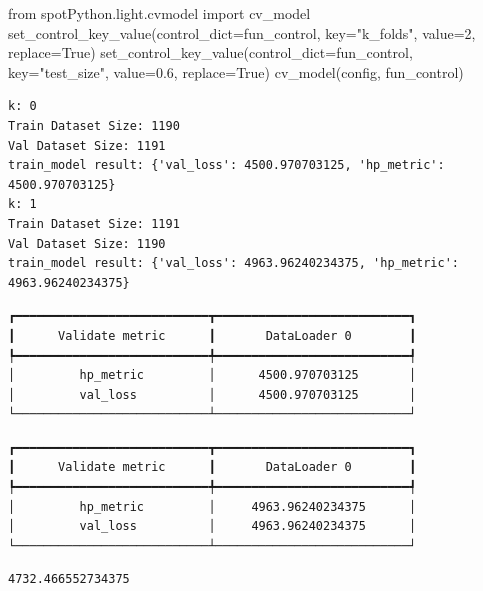 \documentclass[
  letterpaper,
  DIV=11,
  numbers=noendperiod]{scrreprt}
\newenvironment{Shaded}{\begin{snugshade}}{\end{snugshade}}
\newcommand{\DecValTok}[1]{\textcolor[rgb]{0.68,0.00,0.00}{#1}}
\newcommand{\FloatTok}[1]{\textcolor[rgb]{0.68,0.00,0.00}{#1}}
\newcommand{\ImportTok}[1]{\textcolor[rgb]{0.00,0.46,0.62}{#1}}
\newcommand{\NormalTok}[1]{\textcolor[rgb]{0.00,0.23,0.31}{#1}}
\newcommand{\OperatorTok}[1]{\textcolor[rgb]{0.37,0.37,0.37}{#1}}
\newcommand{\StringTok}[1]{\textcolor[rgb]{0.13,0.47,0.30}{#1}}
\newcommand{\VariableTok}[1]{\textcolor[rgb]{0.07,0.07,0.07}{#1}}
\begin{document}
\begin{Shaded}
\begin{Highlighting}[]
\ImportTok{from}\NormalTok{ spotPython.light.cvmodel }\ImportTok{import}\NormalTok{ cv\_model}
\NormalTok{set\_control\_key\_value(control\_dict}\OperatorTok{=}\NormalTok{fun\_control,}
\NormalTok{                        key}\OperatorTok{=}\StringTok{"k\_folds"}\NormalTok{,}
\NormalTok{                        value}\OperatorTok{=}\DecValTok{2}\NormalTok{,}
\NormalTok{                        replace}\OperatorTok{=}\VariableTok{True}\NormalTok{)}
\NormalTok{set\_control\_key\_value(control\_dict}\OperatorTok{=}\NormalTok{fun\_control,}
\NormalTok{                        key}\OperatorTok{=}\StringTok{"test\_size"}\NormalTok{,}
\NormalTok{                        value}\OperatorTok{=}\FloatTok{0.6}\NormalTok{,}
\NormalTok{                        replace}\OperatorTok{=}\VariableTok{True}\NormalTok{)}
\NormalTok{cv\_model(config, fun\_control)}
\end{Highlighting}
\end{Shaded}

\begin{verbatim}
k: 0
Train Dataset Size: 1190
Val Dataset Size: 1191
train_model result: {'val_loss': 4500.970703125, 'hp_metric': 4500.970703125}
k: 1
Train Dataset Size: 1191
Val Dataset Size: 1190
train_model result: {'val_loss': 4963.96240234375, 'hp_metric': 4963.96240234375}
\end{verbatim}

\begin{verbatim}
┏━━━━━━━━━━━━━━━━━━━━━━━━━━━┳━━━━━━━━━━━━━━━━━━━━━━━━━━━┓
┃      Validate metric      ┃       DataLoader 0        ┃
┡━━━━━━━━━━━━━━━━━━━━━━━━━━━╇━━━━━━━━━━━━━━━━━━━━━━━━━━━┩
│         hp_metric         │      4500.970703125       │
│         val_loss          │      4500.970703125       │
└───────────────────────────┴───────────────────────────┘
\end{verbatim}

\begin{verbatim}
┏━━━━━━━━━━━━━━━━━━━━━━━━━━━┳━━━━━━━━━━━━━━━━━━━━━━━━━━━┓
┃      Validate metric      ┃       DataLoader 0        ┃
┡━━━━━━━━━━━━━━━━━━━━━━━━━━━╇━━━━━━━━━━━━━━━━━━━━━━━━━━━┩
│         hp_metric         │     4963.96240234375      │
│         val_loss          │     4963.96240234375      │
└───────────────────────────┴───────────────────────────┘
\end{verbatim}

\begin{verbatim}
4732.466552734375
\end{verbatim}
\end{document}
